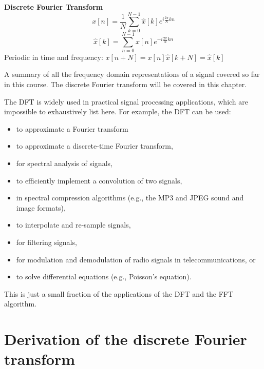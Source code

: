 \begin{marginfigure}
  \noindent \textbf{Discrete Fourier Transform}
  \newline
  \begin{equation*}
    x[n] = \frac{1}{N}\sum_{k=0}^{N-1}\hat{x}[k] e^{i\frac{2\pi}{N}kn}
  \end{equation*}
  \begin{equation*}
    \hat{x}[k] = \sum_{n=0}^{N-1}x[n] e^{-i\frac{2\pi}{N}kn}
  \end{equation*} \newline
  Periodic in time and frequency: \newline$x[n+ N]=x[n]$\newline $\hat{x}[k+ N]=\hat{x}[k]$
  \newline
  \noindent \hrulefill

  \caption{A summary of all the frequency domain representations of a
    signal covered so far in this course.
    The discrete Fourier transform will be covered in this chapter.}
  \label{fig:summary_fourier}
\end{marginfigure}

The DFT is widely used in practical signal processing applications,
which are impossible to exhaustively list here. For example, the DFT
can be used:
\begin{itemize}
  \item to approximate a Fourier transform
  \item to approximate a discrete-time Fourier transform,
  \item for spectral analysis of signals,
  \item to efficiently implement a convolution of two signals,
  \item in spectral  compression algorithms (e.g., the MP3 and JPEG sound and image formats),
  \item to interpolate and re-sample signals,
  \item for filtering signals,
  \item for modulation and demodulation of radio signals in telecommunications, or
  \item to solve differential equations (e.g., Poisson's equation).
\end{itemize}
This is just a small fraction of the applications of the DFT and the FFT algorithm.

\section{Derivation of the discrete Fourier transform}

